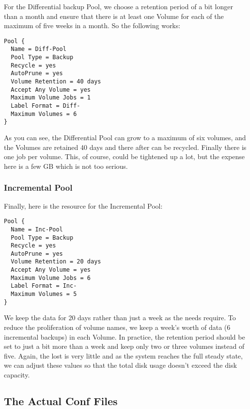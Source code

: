 For the Differential backup Pool, we choose a retention period of a bit longer
than a month and ensure that there is at least one Volume for each of the
maximum of five weeks in a month. So the following works: 

\footnotesize
\begin{verbatim}
Pool {
  Name = Diff-Pool
  Pool Type = Backup
  Recycle = yes
  AutoPrune = yes
  Volume Retention = 40 days
  Accept Any Volume = yes
  Maximum Volume Jobs = 1
  Label Format = Diff-
  Maximum Volumes = 6
}
\end{verbatim}
\normalsize

As you can see, the Differential Pool can grow to a maximum of six volumes,
and the Volumes are retained 40 days and there after can be recycled. Finally
there is one job per volume. This, of course, could be tightened up a lot, but
the expense here is a few GB which is not too serious. 
\label{IncPool}

\subsubsection*{Incremental Pool}

Finally, here is the resource for the Incremental Pool: 

\footnotesize
\begin{verbatim}
Pool {
  Name = Inc-Pool
  Pool Type = Backup
  Recycle = yes
  AutoPrune = yes
  Volume Retention = 20 days
  Accept Any Volume = yes
  Maximum Volume Jobs = 6
  Label Format = Inc-
  Maximum Volumes = 5
}
\end{verbatim}
\normalsize

We keep the data for 20 days rather than just a week as the needs require. To
reduce the proliferation of volume names, we keep a week's worth of data (6
incremental backups) in each Volume. In practice, the retention period should
be set to just a bit more than a week and keep only two or three volumes
instead of five. Again, the lost is very little and as the system reaches the
full steady state, we can adjust these values so that the total disk usage
doesn't exceed the disk capacity. 
\label{Example}

\subsection*{The Actual Conf Files}

